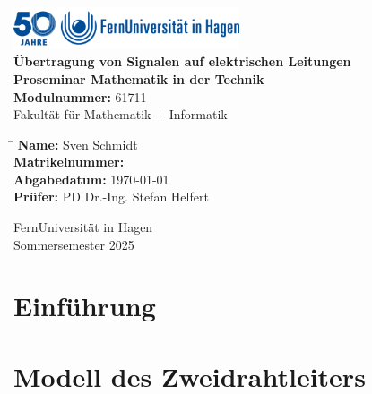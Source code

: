 \documentclass[paper=a4, parskip=half-, ngerman, fontsize=11pt]{scrreprt}
\begin{document}
\begin{titlepage}
    \begin{center}
        \includegraphics[width=0.5\textwidth]{logo_fernuni_hagen.png}\\[2cm]

        {\LARGE \textbf{Übertragung von Signalen auf elektrischen Leitungen}}\\[2cm]

        \textbf{Proseminar Mathematik in der Technik}\\
        \textbf{Modulnummer:} 61711\\
        Fakultät für Mathematik + Informatik\\[0.5cm]

        \begin{tabbing}
            \hspace{6cm} \= \kill
            \textbf{Name:} \> Sven Schmidt \\
            \textbf{Matrikelnummer:}  \\
            \textbf{Abgabedatum:} \> \today \\
            \textbf{Prüfer:} \> PD Dr.-Ing. Stefan Helfert \\
        \end{tabbing}

        \vfill

        {\large FernUniversität in Hagen}\\
        {\large Sommersemester 2025}
    \end{center}
\end{titlepage}

\chapter{Einführung}

\chapter{Modell des Zweidrahtleiters}
\end{document}
